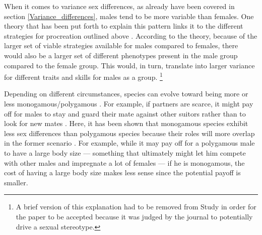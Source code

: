 When it comes to variance sex differences, as already have been covered in section \ref{Variance_differences}, males tend to be more variable than females. One theory that has been put forth to explain this pattern links it to the different strategies for procreation outlined above \parencite{Moore1991}. According to the theory, because of the larger set of viable strategies available for males compared to females, there would also be a larger set of different phenotypes present in the male group compared to the female group. This would, in turn, translate into larger variance for different traits and skills for males as a group. \footnote{\label{Footnote:Frontiers} A brief version of this explanation had to be removed from Study  in order for the paper to be accepted because it was judged by the journal to potentially drive a sexual stereotype.}

Depending on different circumstances, species can evolve toward being more or less monogamous/polygamous \parencite{Kleiman1977}. For example, if partners are scarce, it might pay off for males to stay and guard their mate against other suitors rather than to look for new mates \parencite{Schacht2016}. Here, it has been shown that monogamous species exhibit less sex differences than polygamous species because their roles will more overlap in the former scenario \parencite{Gaulin1992}. For example, while it may pay off for a polygamous male to have a large body size --- something that ultimately might let him compete with other males and impregnate a lot of females --- if he is monogamous, the cost of having a large body size makes less sense since the potential payoff is smaller.

